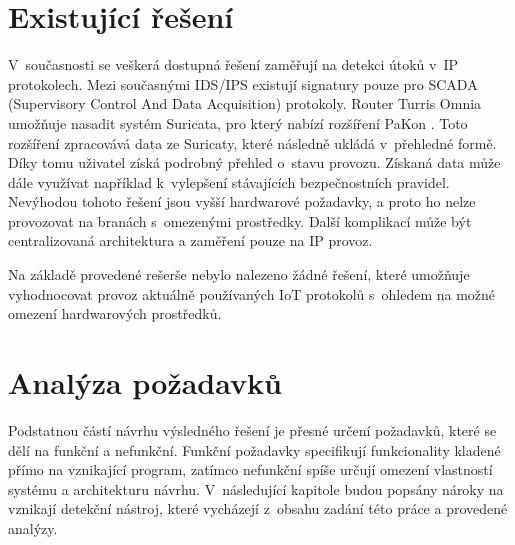  \section{Existující řešení}
 V~současnosti se veškerá dostupná řešení zaměřují na detekci útoků v~IP protokolech. Mezi 
 současnými IDS/IPS existují signatury pouze pro SCADA (Supervisory Control And Data Acquisition)
 protokoly. Router Turris Omnia umožňuje nasadit systém Suricata, pro který nabízí rozšíření 
 PaKon \cite{pakon}. Toto rozšíření zpracovává data ze Suricaty, které následně ukládá v~přehledné formě.
 Díky tomu uživatel získá podrobný přehled o~stavu provozu. Získaná data může dále využívat 
 například k~vylepšení stávajících bezpečnostních pravidel. Nevýhodou tohoto řešení jsou 
 vyšší hardwarové požadavky, a proto ho nelze provozovat na branách s~omezenými 
 prostředky. Další komplikací může být centralizovaná architektura a zaměření pouze na 
 IP provoz.
 
 Na základě provedené rešerše nebylo nalezeno žádné řešení, které umožňuje vyhodnocovat 
 provoz aktuálně používaných IoT protokolů s~ohledem na možné omezení hardwarových
 prostředků.
 
 \newpage
 \section{Analýza požadavků}
 Podstatnou částí návrhu výsledného řešení je přesné určení požadavků, které se dělí na 
 funkční a nefunkční. Funkční požadavky specifikují funkcionality kladené přímo na vznikající
 program, zatímco nefunkční spíše určují omezení vlastností systému a architekturu návrhu.
V~následující kapitole budou popsány nároky na vznikají detekční nástroj, které vycházejí z~obsahu
 zadání této práce a provedené analýzy.
 
